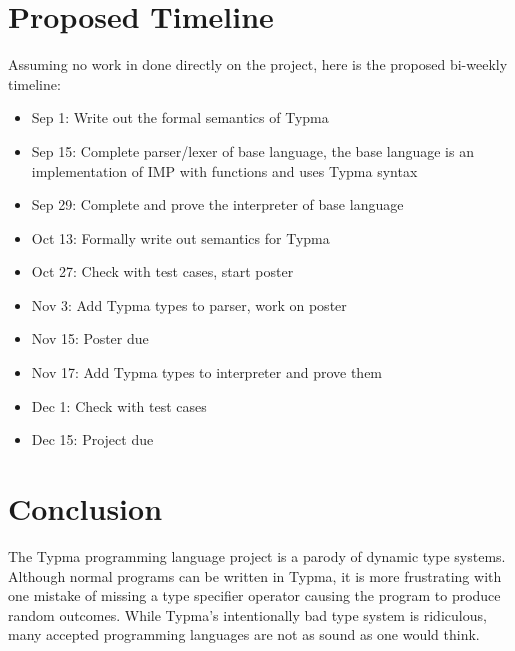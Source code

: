 \documentclass[10pt,twocolumn]{article}
\begin{document}
\section{Proposed Timeline}

Assuming no work in done directly on the project, here is the proposed bi-weekly timeline:

\begin{itemize}

\item Sep 1: Write out the formal semantics of Typma

\item Sep 15: Complete parser/lexer of base language, the base language is an implementation of IMP with functions and uses Typma syntax

\item Sep 29: Complete and prove the interpreter of base language

\item Oct 13: Formally write out semantics for Typma

\item Oct 27: Check with test cases, start poster

\item Nov 3: Add Typma types to parser, work on poster

\item Nov 15: Poster due

\item Nov 17: Add Typma types to interpreter and prove them

\item Dec 1: Check with test cases

\item Dec 15: Project due

\end{itemize}

\section{Conclusion}

The Typma programming language project is a parody of dynamic type systems. Although normal programs can be written in Typma, it is more frustrating with one mistake of missing a type specifier operator causing the program to produce random outcomes. While Typma's intentionally bad type system is ridiculous, many accepted programming languages are not as sound as one would think.

\printbibliography 
\end{document}
